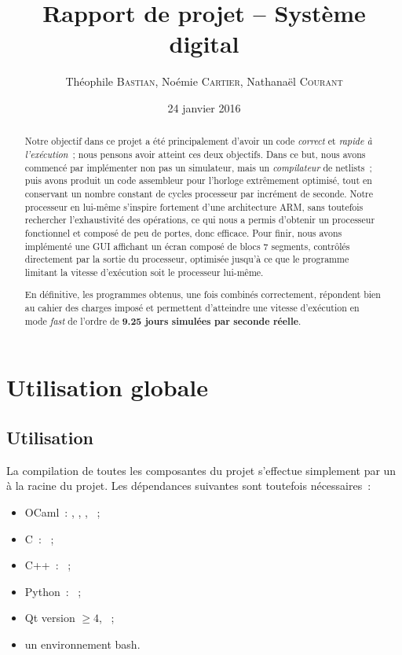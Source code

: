 \documentclass[11pt,a4paper]{article}
\author{Théophile \textsc{Bastian}, Noémie \textsc{Cartier}, Nathanaël \textsc{Courant}}
\title{Rapport de projet -- Système digital}
\date{24 janvier 2016} %
\newcommand{\relire}{}
\newcommand{\relu}[1]{}
\begin{document}
\maketitle

\relire
\relu{No}
\relu{Nathanaël}
\begin{abstract}
Notre objectif dans ce projet a été principalement d'avoir un code \emph{correct} et \emph{rapide à l'exécution}~; nous pensons avoir atteint ces deux objectifs. Dans ce but, nous avons commencé par implémenter non pas un simulateur, mais un \emph{compilateur} de netlists~; puis avons produit un code assembleur pour l'horloge extrêmement optimisé, tout en conservant un nombre constant de cycles processeur par incrément de seconde. Notre processeur en lui-même s'inspire fortement d'une architecture ARM, sans toutefois rechercher l'exhaustivité des opérations, ce qui nous a permis d'obtenir un processeur fonctionnel et composé de peu de portes, donc efficace. Pour finir, nous avons implémenté une GUI affichant un écran composé de blocs 7 segments, contrôlés directement par la sortie du processeur, optimisée jusqu'à ce que le programme limitant la vitesse d'exécution soit le processeur lui-même.

En définitive, les programmes obtenus, une fois combinés correctement, répondent bien au cahier des charges imposé et permettent d'atteindre une vitesse d'exécution en mode \textit{fast} de l'ordre de \textbf{9.25 jours simulées par seconde réelle}.
\end{abstract}

\setcounter{tocdepth}{2} %
\tableofcontents
\pagebreak


\section{Utilisation globale}

\relire
\relu{Nathanaël}
\relu{No}
\relu{Théo}

\subsection{Utilisation}

La compilation de toutes les composantes du projet s'effectue simplement par un  à la racine du projet. Les dépendances suivantes sont toutefois nécessaires~:

\begin{itemize}
\item OCaml~: , , , ~;
\item C~: ~;
\item C++~: ~;
\item Python~: ~;
\item Qt version $\geq 4$, ~;
\item un environnement bash.
\end{itemize}
\end{document}
